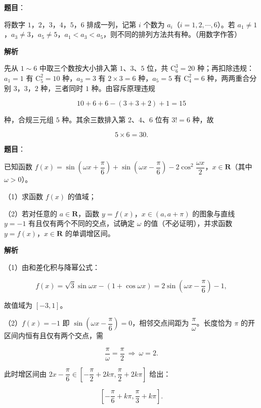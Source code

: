 \begin{answer}

\textbf{题目}：

将数字 $1$，$2$，$3$，$4$，$5$，$6$ 排成一列，记第 $i$ 个数为 $a_i$（$i=1,2,\cdots,6$）。若 $a_1\neq1$，$a_3\neq3$，$a_5\neq5$，$a_1<a_3<a_5$，则不同的排列方法共有\gkblank{}种。（用数字作答）

\textbf{解析}

先从 $1\sim6$ 中取三个数按大小排入第 $1$、$3$、$5$ 位，共 $\mathrm C_6^3=20$ 种；再扣除违规：$a_1=1$ 有 $\mathrm C_5^2=10$ 种，$a_3=3$ 有 $2\times3=6$ 种，$a_5=5$ 有 $\mathrm C_4^2=6$ 种，两两重合分别 $3$，$3$，$2$ 种，三者同时 $1$ 种。由容斥原理违规

\nopagebreak[4]
\[10+6+6-(3+3+2)+1=15\]

种，合规三元组 $5$ 种。其余三数排入第 $2$、$4$、$6$ 位有 $3!=6$ 种，故

\nopagebreak[4]
\[5\times6=30.\]


\end{answer}
\begin{answer}

\textbf{题目}：

已知函数 $f(x)=\sin\left(\omega x+\dfrac{\pi}{6}\right)+\sin\left(\omega x-\dfrac{\pi}{6}\right)-2\cos^2\dfrac{\omega x}{2}$，$x\in\mathbf R$（其中 $\omega>0$）。

（1）求函数 $f(x)$ 的值域；

（2）若对任意的 $a\in\mathbf R$，函数 $y=f(x)$，$x\in(a,a+\pi)$ 的图象与直线 $y=-1$ 有且仅有两个不同的交点，试确定 $\omega$ 的值（不必证明），并求函数 $y=f(x)$，$x\in\mathbf R$ 的单调增区间。

\textbf{解析}

（1）由和差化积与降幂公式：

\nopagebreak[4]
\[f(x)=\sqrt3\sin\omega x-(1+\cos\omega x)=2\sin\left(\omega x-\frac{\pi}6\right)-1,\]

故值域为 $[-3,1]$。

（2）$f(x)=-1$ 即 $\sin\left(\omega x-\dfrac{\pi}6\right)=0$，相邻交点间距为 $\dfrac{\pi}\omega$。长度恰为 $\pi$ 的开区间内恒有且仅有两个交点，需

\nopagebreak[4]
\[\frac{\pi}\omega=\frac{\pi}2\ \Rightarrow\ \omega=2.\]

此时增区间由 $2x-\dfrac{\pi}6\in\left[-\dfrac{\pi}2+2k\pi,\dfrac{\pi}2+2k\pi\right]$ 给出：

\nopagebreak[4]
\[\left[-\frac{\pi}6+k\pi,\frac{\pi}3+k\pi\right].\]


\end{answer}
